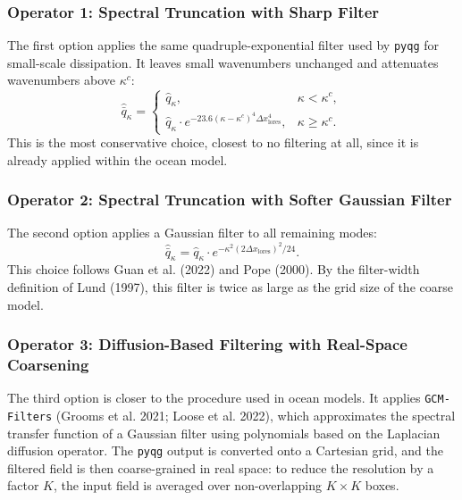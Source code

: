 \documentclass[../SQG_notes.tex]{subfiles}
\begin{document}
    \subsubsection{Operator 1: Spectral Truncation with Sharp Filter}
    The first option applies the same quadruple-exponential filter used by \texttt{pyqg} for small-scale dissipation. It leaves small wavenumbers unchanged and attenuates wavenumbers above $\kappa^c$:
    \begin{equation}
        \hat{\bar{q}}_\kappa =
        \begin{cases}
            \hat{q}_\kappa, & \kappa < \kappa^c, \\
            \hat{q}_\kappa \cdot e^{-23.6(\kappa - \kappa^c)^4 \Delta x_{\text{lores}}^4}, & \kappa \geq \kappa^c.
        \end{cases}
    \end{equation}
    This is the most conservative choice, closest to no filtering at all, since it is already applied within the ocean model. 

    \subsubsection{Operator 2: Spectral Truncation with Softer Gaussian Filter}
    The second option applies a Gaussian filter to all remaining modes:
    \begin{equation}
        \hat{\bar{q}}_\kappa = \hat{q}_\kappa \cdot e^{-\kappa^2 (2 \Delta x_{\text{lores}})^2 / 24}.
    \end{equation}
    This choice follows Guan et al. (2022) and Pope (2000). By the filter-width definition of Lund (1997), this filter is twice as large as the grid size of the coarse model.

    \subsubsection{Operator 3: Diffusion-Based Filtering with Real-Space Coarsening}
    The third option is closer to the procedure used in ocean models. It applies \texttt{GCM-Filters} (Grooms et al. 2021; Loose et al. 2022), which approximates the spectral transfer function of a Gaussian filter using polynomials based on the Laplacian diffusion operator. The \texttt{pyqg} output is converted onto a Cartesian grid, and the filtered field is then coarse-grained in real space: to reduce the resolution by a factor $K$, the input field is averaged over non-overlapping $K \times K$ boxes.
\end{document}

